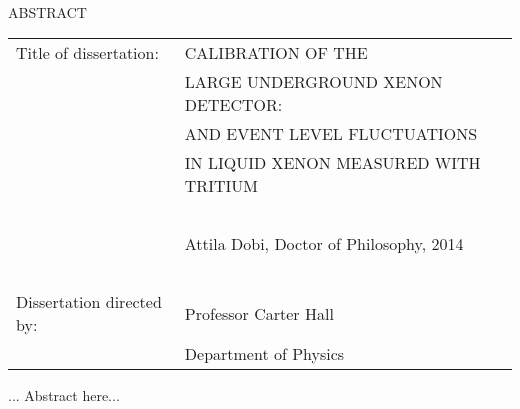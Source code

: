 
\hbox{\ }

\renewcommand{\baselinestretch}{1}
\small \normalsize

\begin{center}
\large{{ABSTRACT}} 

\vspace{3em} 

\end{center}
\hspace{-.15in}
\begin{tabular}{ll}
Title of dissertation:    & {\large  CALIBRATION OF THE }\\
&				      {\large  LARGE UNDERGROUND XENON DETECTOR:} \\
&				      {\large  AND EVENT LEVEL FLUCTUATIONS} \\
&				      {\large  IN LIQUID XENON MEASURED WITH TRITIUM} \\

\ \\
&                          {\large  Attila Dobi, Doctor of Philosophy, 2014} \\
\ \\
Dissertation directed by: & {\large  Professor Carter Hall} \\
&  				{\large	 Department of Physics } \\
\end{tabular}

\vspace{3em}

\renewcommand{\baselinestretch}{2}
\large \normalsize

... Abstract here...

